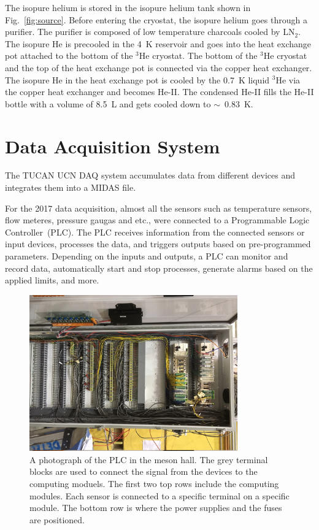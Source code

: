 The isopure helium is stored in the isopure helium tank shown in
Fig.~\ref{fig:source}. Before entering the cryostat, the isopure
helium goes through a purifier. The purifier is composed of low
temperature charcoals cooled by LN$_2$.  The isopure He is precooled
in the 4~K reservoir and goes into the heat exchange pot attached to
the bottom of the $^3$He cryostat. The bottom of the $^3$He cryostat
and the top of the heat exchange pot is connected via the copper heat
exchanger. The isopure He in the heat exchange pot is cooled by the
0.7~K liquid $^3$He via the copper heat exchanger and becomes
He-II. The condensed He-II fills the He-II bottle with a volume of
8.5~L and gets cooled down to $\sim$~0.83~K.




\section{Data Acquisition System\label{sec:DAQ}}
The TUCAN UCN DAQ system accumulates data from different devices and
integrates them into a MIDAS file.

For the 2017 data acquisition, almost all the sensors such as
temperature sensors, flow meteres, pressure gaugas and etc., were
connected to a Programmable Logic Controller~(PLC). The PLC receives
information from the connected sensors or input devices, processes the
data, and triggers outputs based on pre-programmed parameters.
Depending on the inputs and outputs, a PLC can monitor and record
data, automatically start and stop processes, generate alarms based on
the applied limits, and more.

\begin{figure}[h!]
  \centering
  \includegraphics[width=0.8\textwidth, angle = 90]{PLC.JPG}
  \caption[TUCAN's PLC in the meson hall]{A photograph of the PLC in
    the meson hall. The grey terminal blocks are used to connect the
    signal from the devices to the computing moduels. The first two
    top rows include the computing modules. Each sensor is connected
    to a specific terminal on a specific module. The bottom row is
    where the power supplies and the fuses are positioned. }
  \label{fig:PLC}
\end{figure}

